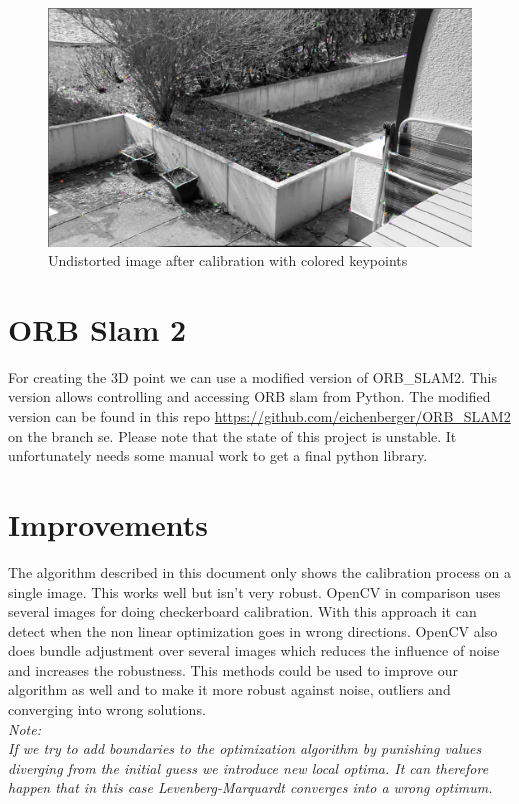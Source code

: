 \documentclass[11pt,a4paper,titlepage,oneside]{report}
\begin{document}
\begin{figure}[H]
  \begin{center}
		\includegraphics[width=1.0\textwidth]{img/calib_output.png}
  \end{center}
	\caption{Undistorted image after calibration with colored keypoints}\label{fig:undistorted}
\end{figure}

\section{ORB Slam 2}
For creating the 3D point we can use a modified version of ORB\_SLAM2. This version allows controlling and accessing ORB slam from Python. The modified version can be found in this repo \url{https://github.com/eichenberger/ORB\_SLAM2} on the branch se. Please note that the state of this project is unstable. It unfortunately needs some manual work to get a final python library.

\section{Improvements}\label{sec:improvements}
The algorithm described in this document only shows the calibration process on a single image. This works well but isn't very robust. OpenCV in comparison uses several images for doing checkerboard calibration. With this approach it can detect when the non linear optimization goes in wrong directions. OpenCV also does bundle adjustment over several images which reduces the influence of noise and increases the robustness. This methods could be used to improve our algorithm as well and to make it more robust against noise, outliers and converging into wrong solutions.\\
\em
Note:\\
If we try to add boundaries to the optimization algorithm by punishing values diverging from the initial guess we introduce new local optima. It can therefore happen that in this case Levenberg-Marquardt converges into a wrong optimum.
\normalfont
\end{document}
